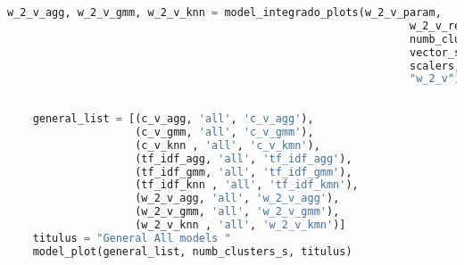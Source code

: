 \documentclass[12pt]{article}
\begin{document}
\begin{lstlisting}[language=Python, caption = Rutina de Visualización]
	w_2_v_agg, w_2_v_gmm, w_2_v_knn = model_integrado_plots(w_2_v_param, 
	                                                           w_2_v_res, 
	                                                           numb_clusters_s, 
	                                                           vector_size_s, 
	                                                           scalers, 
	                                                           "w_2_v")
	
	
	general_list = [(c_v_agg, 'all', 'c_v_agg'),
	                (c_v_gmm, 'all', 'c_v_gmm'),
	                (c_v_knn , 'all', 'c_v_kmn'),
	                (tf_idf_agg, 'all', 'tf_idf_agg'),
	                (tf_idf_gmm, 'all', 'tf_idf_gmm'),
	                (tf_idf_knn , 'all', 'tf_idf_kmn'),
	                (w_2_v_agg, 'all', 'w_2_v_agg'),
	                (w_2_v_gmm, 'all', 'w_2_v_gmm'),
	                (w_2_v_knn , 'all', 'w_2_v_kmn')]
	titulus = "General All models "
	model_plot(general_list, numb_clusters_s, titulus)
	\end{lstlisting}
	
	
	
	
\end{document}
